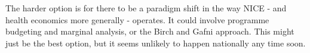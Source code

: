 The harder option is for there to be a paradigm shift in the way NICE - and health economics more generally - operates. It could involve programme budgeting and marginal analysis, or the Birch and Gafni approach\cite{Ruta_2005}\cite{Birch_1992}\cite{Gafni_2006}. This might just be the best option, but it seems unlikely to happen nationally any time soon.